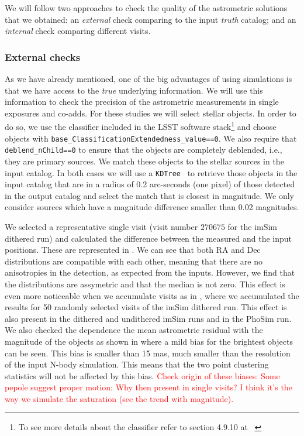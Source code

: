 \documentclass[\docopts]{\docclass}
\begin{document}
We will follow two approaches to check the quality of the astrometric solutions that we obtained: an \textit{external} check
comparing to the input \textit{truth} catalog; and an \textit{internal} check comparing different visits.

\subsubsection{External checks}
\label{sec:external_astrometry}

As we have already mentioned, one of the big advantages of using simulations is that we have access to the \textit{true}
underlying information. We will use this information to check the precision of the astrometric measurements in single exposures
and co-adds. For these studies we will select stellar objects. In order to do so, we use the classifier
included in the LSST software stack\footnote{To see more details about the classifier refer to section 4.9.10 at
~\citep{2017arXiv170506766B}} and choose objects with \texttt{base\_ClassificationExtendedness\_value==0}.
We also require that \texttt{deblend\_nChild==0} to ensure that the objects are completely deblended, i.e., they are primary
sources. We match these objects to the stellar sources in the input catalog. In both cases we will use a
\texttt{KDTree}~\citep{scikit-learn} to retrieve those objects in the input catalog that are in a radius of 0.2 arc-seconds
(one pixel) of those detected in the output catalog and select the match that is closest in magnitude. We only consider sources
which have a magnitude difference smaller than 0.02 magnitudes.

We selected a representative single visit (visit number $270675$ for the imSim dithered run) and calculated the difference
between the measured and the input positions. These are represented in . We can see that both RA and Dec
distributions are compatible with each other, meaning that there are no anisotropies in the detection, as expected from the inputs.
However, we find that the distributions are assymetric and that the median is not zero. This effect is even more noticeable when we
accumulate visits as in , where we accumulated the results for 50 randomly selected visits of the imSim dithered
run. This effect is also present in the dithered and undithered imSim runs and in the PhoSim run. We also checked the dependence the
mean astrometric residual with the magnitude of the objects as shown in  where a mild bias for the brightest
objects can be seen. This bias is smaller than 15 mas, much smaller than the resolution of the input N-body simulation. This means
that the two point clustering statistics will not be affected by this bias.
\textcolor{red}{Check origin of these biases: Some pepole suggest proper motion: Why then
present in single visits? I think it's the way we simulate the saturation (see the trend with magnitude).}
\end{document}
